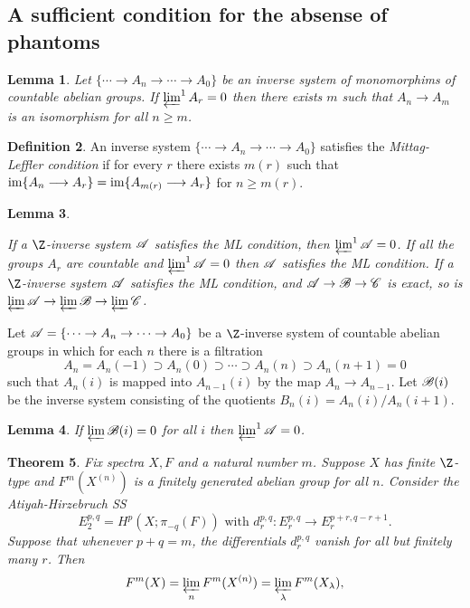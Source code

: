 \documentclass[11pt]{article}
\renewcommand{\comment}{}
\theoremstyle{plain}
\newtheorem{thm}{Theorem}[subsection]
\newtheorem{lem}[thm]{Lemma}
\theoremstyle{definition}
\newtheorem{defn}[thm]{Definition}
\begin{document}
\subsection{A sufficient condition for the absense of phantoms}
\comment{
\begin{lem}
Let $\{\cdots\rightarrow A_{n}\rightarrow\cdots\rightarrow A_0\}$ be an inverse
system of monomorphims of countable abelian groups. If $\varprojlim^1 A_r=0$
then there exists $m$ such that $A_n\to A_m$ is an isomorphism for all $n\geq
m$.
\end{lem}
\begin{defn}
An inverse system $\{\cdots\rightarrow A_{n}\rightarrow\cdots\rightarrow A_0\}$ satisfies the \emph{Mittag-Leffler condition} if for every $r$ there exists $m(r)$ such that $\operatorname{im}\{A_n\longrightarrow A_r\}=\operatorname{im}\{A_{m(r)}\longrightarrow A_r\}$ for $n\geq m(r)$.
\end{defn}
\begin{lem}
\hfil
\begin{itemise}
\itm[(i)] If a $\Z$-inverse system $\mathscr{A}$ satisfies the ML condition, then $\varprojlim^1\mathscr{A}=0$.
\itm[(ii)] If all the groups $A_r$ are countable and $\varprojlim^1\mathscr{A}=0$ then $\mathscr{A}$ satisfies the ML condition.
\itm[(iii)] If a $\Z$-inverse system $\mathscr{A}$ satisfies the ML condition, and $\mathscr{A}\rightarrow\mathscr{B}\rightarrow\mathscr{C}$ is exact, so is $\varprojlim\mathscr{A}\rightarrow\varprojlim\mathscr{B}\rightarrow\varprojlim\mathscr{C}$.
\end{itemise}
\end{lem}
Let $\mathscr{A}=\{\cdots\rightarrow A_{n}\rightarrow\cdots\rightarrow A_0\}$ be a $\Z$-inverse system of countable abelian groups in which for each $n$ there is a filtration
\[A_n=A_n(-1)\supset A_n(0)\supset\cdots\supset A_n(n)\supset A_n(n+1)=0\]
such that $A_n(i)$ is mapped into $A_{n-1}(i)$ by the map $A_n\to A_{n-1}$. Let $\mathscr{B}(i)$ be the inverse system consisting of the quotients $B_n(i)=A_n(i)/A_n(i+1)$.
\begin{lem}
If $\varprojlim\mathscr{B}(i)=0$ for all $i$ then $\varprojlim^1\mathscr{A}=0$.
\end{lem}
\begin{thm}
Fix spectra $X,F$ and a natural number $m$. Suppose $X$ has finite $\Z$-type and $F^m(X^{(n)})$ is a finitely generated abelian group for all $n$. Consider the Atiyah-Hirzebruch SS\upcol
\[E_2^{p,q}=H^p(X;\pi_{-q}(F))
\text{\ \ with\ \ }d_r^{p,q}:E_r^{p,q}\to E_r^{p+r,q-r+1}.\]
Suppose that whenever $p+q=m$, the differentials $d_r^{p,q}$ vanish for all but finitely many $r$. Then
\[F^m(X)=\varprojlim_n F^m(X^{(n)})=\varprojlim_\lambda F^m(X_\lambda),\]

\end{thm}}
\end{document}
